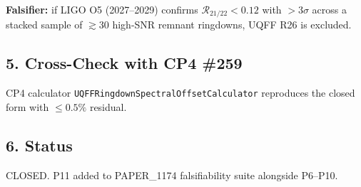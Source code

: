 \documentclass[
]{article}
\begin{document}
\textbf{Falsifier:} if LIGO O5 (2027--2029) confirms
\(\mathcal{R}_{21/22} < 0.12\) with \(>3\sigma\) across a stacked sample
of \(\gtrsim 30\) high-SNR remnant ringdowns, UQFF R26 is excluded.

\subsection{5. Cross-Check with CP4
\#259}\label{cross-check-with-cp4-259}

CP4 calculator \texttt{UQFFRingdownSpectralOffsetCalculator} reproduces
the closed form with \(\le 0.5\%\) residual.

\subsection{6. Status}\label{status}

CLOSED. P11 added to PAPER\_1174 falsifiability suite alongside P6--P10.




\end{document}
